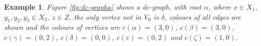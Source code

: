 \documentclass[a4paper,12pt]{article}
\renewcommand{\a}{\alpha }
\renewcommand{\b}{\beta }
\newcommand{\g}{\gamma }
\renewcommand{\d}{\delta }
\newcommand{\e}{\varepsilon }
\newcommand{\z}{\zeta }
\newtheorem{exam}[theorem]{Example}
\newenvironment{example}{\begin{exam} \rm}{\end{exam}}
\numberwithin{equation}{section}
\numberwithin{figure}{section}
\begin{document}
\begin{example}\label{ex:dc-graph}
Figure \ref{fig:dc-grapha} shows a dc-graph, with root $\a$, 
where $x\in X_1$, $y_1,y_2,y_3\in X_2$,
$z\in Z$, the only vertex not in $V_0$ is $\d$, 
colours of all edges are shown and the colours of vertices  are 
$c(\a)=(3,0)$, $c(\b)=(3,0)$, $c(\g)=(0,2)$, $c(\d)=(0,0)$, $c(\e)=(0,2)$ and 
$c(\z)=(1,0)$.  
\end{example}
\begin{figure}
\begin{center}
\psfrag{a}{$\a$}
\psfrag{b}{$\b$}
\psfrag{c}{$\g$}
\psfrag{d}{$\d$}
\psfrag{e}{$\e$}
\psfrag{f}{$\z$}
\hspace{15mm}
\end{center}
\end{figure}
\end{document}
